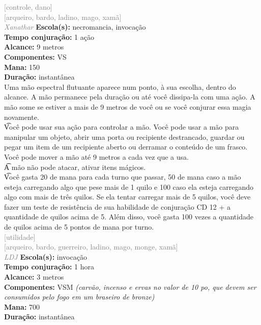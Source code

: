 \documentclass{RPG_Adventure}[2021/10/20]
\begin{document}
{\scriptsize \textcolor{gray}{[controle, dano]\\}}
{\scriptsize \textcolor{gray}{[arqueiro, bardo, ladino, mago, xamã]\\}}
{\tiny \textcolor{gray}{\textit{Xanathar}}}\jump{}
{\small \t \textbf{Escola(s):} necromancia, invocação\\\t \textbf{Tempo conjuração:} 1 ação\\\t \textbf{Alcance:} 9 metros\\\t \textbf{Componentes:} VS\\\t \textbf{Mana:} 150\\\t \textbf{Duração:} instantânea\\}
{\normalsize Uma mão espectral flutuante aparece num ponto, à sua escolha, dentro do alcance. A mão permanece pela duração ou até você dissipa-la com uma ação. A mão some se estiver a mais de 9 metros de você ou se você conjurar essa magia novamente.\\\t Você pode usar sua ação para controlar a mão. Você pode usar a mão para manipular um objeto, abrir uma porta ou recipiente destrancado, guardar ou pegar um item de um recipiente aberto ou derramar o conteúdo de um frasco. Você pode mover a mão até 9 metros a cada vez que a usa.\\\t A mão não pode atacar, ativar itens mágicos.\\\t Você gasta 20 de mana para cada turno que passar, 50 de mana caso a mão esteja carregando algo que pese mais de 1 quilo e 100 caso ela esteja carregando algo com mais de três quilos. Se ela tentar carregar mais de 5 quilos, você deve fazer um teste de resistência de sua habilidade de conjuração CD 12 + a quantidade de quilos acima de 5. Além disso, você gasta 100 vezes a quantidade de quilos acima de 5 pontos de mana por turno.\\}
{\scriptsize \textcolor{gray}{[utilidade]\\}}
{\scriptsize \textcolor{gray}{[arqueiro, bardo, guerreiro, ladino, mago, monge, xamã]\\}}
{\tiny \textcolor{gray}{\textit{LDJ}}}\jump{}
{\small \t \textbf{Escola(s):} invocação\\\t \textbf{Tempo conjuração:} 1 hora\\\t \textbf{Alcance:} 3 metros\\\t \textbf{Componentes:} VSM \textit{(carvão, incenso e ervas no valor de 10 po, que devem ser consumidos pelo fogo em um braseiro de bronze)}\\\t \textbf{Mana:} 700\\\t \textbf{Duração:} instantânea\\}
\end{document}
